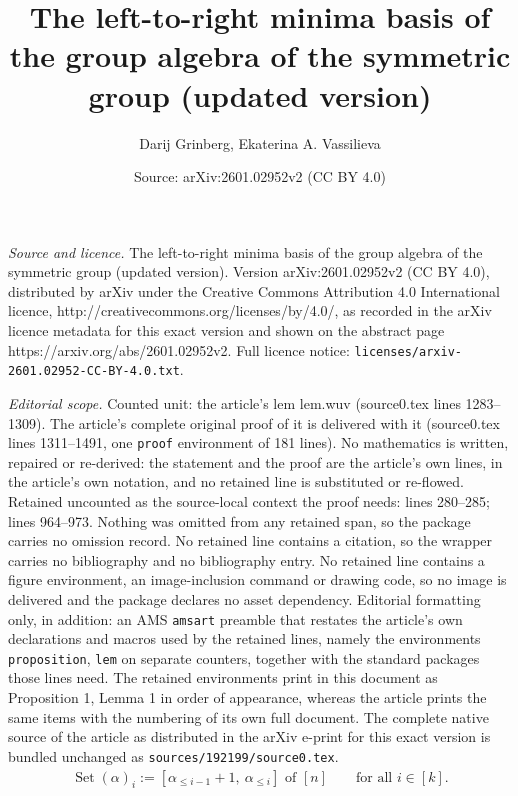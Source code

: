 \documentclass[10pt,a4paper]{amsart}
\title{The left-to-right minima basis of the group algebra of the symmetric group (updated version)}
\author{Darij Grinberg, Ekaterina A. Vassilieva}
\date{Source: arXiv:2601.02952v2 (CC BY 4.0)}
\newcommand{\Set}{\operatorname{Set}}
\newcommand{\ive}[1]{\left[ #1 \right]}
\begin{document}
\maketitle

\noindent\emph{Source and licence.} The left-to-right minima basis of the group algebra of the symmetric group (updated version). Version arXiv:2601.02952v2 (CC BY 4.0), distributed by arXiv under the Creative Commons Attribution 4.0 International licence, http://creativecommons.org/licenses/by/4.0/, as recorded in the arXiv licence metadata for this exact version and shown on the abstract page https://arxiv.org/abs/2601.02952v2. Full licence notice: \texttt{licenses/arxiv-2601.02952-CC-BY-4.0.txt}.\par\smallskip

\noindent\textit{Editorial scope.} Counted unit: the article's lem lem.wuv (source0.tex lines 1283--1309). The article's complete original proof of it is delivered with it (source0.tex lines 1311--1491, one \texttt{proof} environment of 181 lines). No mathematics is written, repaired or re-derived: the statement and the proof are the article's own lines, in the article's own notation, and no retained line is substituted or re-flowed.  Retained uncounted as the source-local context the proof needs: lines 280--285; lines 964--973.  Nothing was omitted from any retained span, so the package carries no omission record.  No retained line contains a citation, so the wrapper carries no bibliography and no bibliography entry.  No retained line contains a figure environment, an image-inclusion command or drawing code, so no image is delivered and the package declares no asset dependency.  Editorial formatting only, in addition: an AMS \texttt{amsart} preamble that restates the article's own declarations and macros used by the retained lines, namely the environments \texttt{proposition}, \texttt{lem} on separate counters, together with the standard packages those lines need.  The retained environments print in this document as Proposition 1, Lemma 1 in order of appearance, whereas the article prints the same items with the numbering of its own full document.  The complete native source of the article as distributed in the arXiv e-print for this exact version is bundled unchanged as \texttt{sources/192199/source0.tex}.
\begin{align}
\Set(\alpha)_i := \ive{ \alpha_{\le i-1} + 1, \ \alpha_{\le i} }
\text{ of } \ive{n}
\qquad \text{for all } i \in [k].
\label{eq.alpha-blocks}
\end{align}
\end{document}
